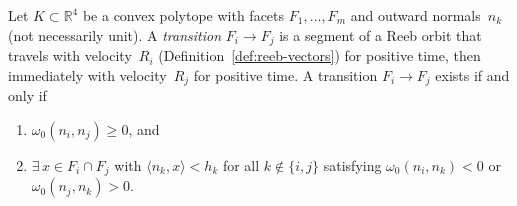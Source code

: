 \begin{lemma}%
\label{lem:transition-feasibility-appendix}
Let $K \subset \mathbb{R}^4$ be a convex polytope with
facets $F_1, \ldots, F_m$ and outward normals~$n_k$
(not necessarily unit).
A \emph{transition} $F_i \to F_j$ is a segment of a
Reeb orbit that travels with velocity~$R_i$
(Definition~\ref{def:reeb-vectors}) for positive time,
then immediately with velocity~$R_j$ for positive time.
A transition $F_i \to F_j$ exists if and only if
\begin{enumerate}
\item $\omega_0(n_i, n_j) \ge 0$, and
\item $\exists\, x \in F_i \cap F_j$ with
  $\langle n_k, x \rangle < h_k$
  for all $k \notin \{i,j\}$ satisfying
  $\omega_0(n_i, n_k) < 0$ or
  $\omega_0(n_j, n_k) > 0$.
\end{enumerate}
\end{lemma}

